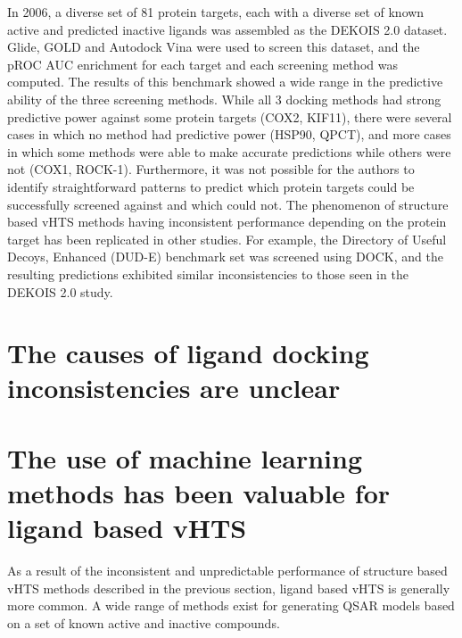 In 2006, a diverse set of 81 protein targets, each with a diverse set of known active and predicted inactive ligands was assembled as the DEKOIS 2.0 dataset\citep{Bauer:2013de}.
Glide, GOLD and Autodock Vina were used to screen this dataset, and the pROC AUC enrichment for each target and each screening method was computed.
The results of this benchmark showed a wide range in the predictive ability of the three screening methods.  
While all 3 docking methods had strong predictive power against some protein targets (COX2, KIF11), there were several cases in which no method had predictive power (HSP90, QPCT), and more cases in which some methods were able to make accurate predictions while others were not (COX1, ROCK-1).
Furthermore, it was not possible for the authors to identify straightforward patterns to predict which protein targets could be successfully screened against and which could not. 
The phenomenon of structure based vHTS methods having inconsistent performance depending on the protein target has been replicated in other studies.
For example, the Directory of Useful Decoys, Enhanced (DUD-E) benchmark set was screened using DOCK, and the resulting predictions exhibited similar inconsistencies to those seen in the DEKOIS 2.0 study\citep{Mysinger:2012hu}.

\section{The causes of ligand docking inconsistencies are unclear}

\section{The use of machine learning methods has been valuable for ligand based vHTS}

As a result of the inconsistent and unpredictable performance of structure based vHTS methods described in the previous section, ligand based vHTS is generally more common.
A wide range of methods exist for generating QSAR models based on a set of known active and inactive compounds.




